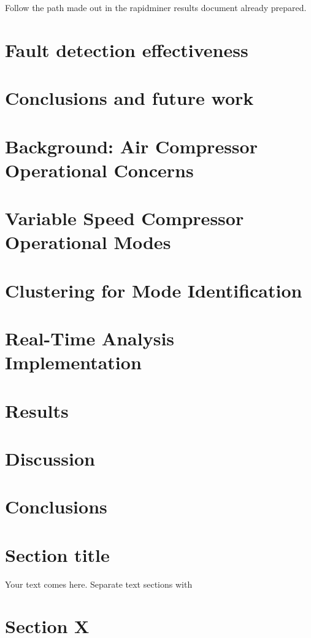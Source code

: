 Follow the path made out in the rapidminer results document already prepared.

\lipsum[1-10]


\section{Fault detection effectiveness}

\section{Conclusions and future work}
\label{sec:conclusions}


\section{Background: Air Compressor Operational Concerns}
\label{sec:1}
\section{Variable Speed Compressor Operational Modes}
\label{sec:2}
\section{Clustering for Mode Identification}
\label{sec:3}
 

\section{Real-Time Analysis Implementation}
\label{sec:4}
\section{Results}
\label{sec:5}
\section{Discussion}
\label{sec:6}
\section{Conclusions}
\label{sec:7}


\section{Section title}
\label{sec:10}
Your text comes here. Separate text sections with
\section{Section X}
\label{sec:x}
